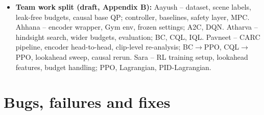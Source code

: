 \documentclass[10pt,a4paper]{article}
\newcommand{\code}[1]{\texttt{\small #1}}
\begin{document}
\begin{itemize}
\code{feedback2.docx}, \code{feedback3.docx} (its request to describe a second dataset was not applied, by the user's
later instruction).
\item \textbf{Team work split (draft, Appendix B):} Aayush -- dataset, scene labels, leak-free budgets, causal base QP;
controller, baselines, safety layer, MPC. Ahhana -- encoder wrapper, Gym env, frozen settings; A2C, DQN. Atharva --
hindsight search, wider budgets, evaluation; BC, CQL, IQL. Pavneet -- CARC pipeline, encoder head-to-head, clip-level
re-analysis; BC$\to$PPO, CQL$\to$PPO, lookahead sweep, causal rerun. Sara -- RL training setup, lookahead features,
budget handling; PPO, Lagrangian, PID-Lagrangian.
\end{itemize}

\section{Bugs, failures and fixes}
\end{document}
